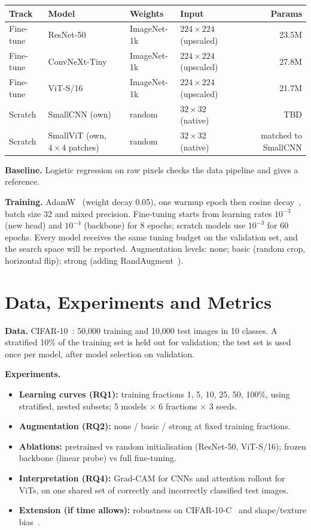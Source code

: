 \documentclass[10pt,a4paper]{article}
\begin{document}
\begin{tabularx}{\linewidth}{@{}lllXr@{}}
\toprule
\textbf{Track} & \textbf{Model} & \textbf{Weights} & \textbf{Input} & \textbf{Params} \\
\midrule
Fine-tune & ResNet-50 & ImageNet-1k & $224\times224$ (upscaled) & 23.5M \\
Fine-tune & ConvNeXt-Tiny & ImageNet-1k & $224\times224$ (upscaled) & 27.8M \\
Fine-tune & ViT-S/16 & ImageNet-1k & $224\times224$ (upscaled) & 21.7M \\
Scratch & SmallCNN (own) & random & $32\times32$ (native) & TBD \\
Scratch & SmallViT (own, $4\times4$ patches) & random & $32\times32$ (native) & matched to SmallCNN \\
\bottomrule
\end{tabularx}
\vspace{2pt}

\textbf{Baseline.} Logistic regression on raw pixels checks the data pipeline and gives a reference.

\textbf{Training.} AdamW~\cite{loshchilov2019adamw} (weight decay 0.05), one warmup epoch then cosine
decay~\cite{loshchilov2017sgdr}, batch size 32 and mixed precision. Fine-tuning starts from learning
rates $10^{-3}$ (new head) and $10^{-4}$ (backbone) for 8 epochs; scratch models use $10^{-3}$ for
60 epochs. Every model receives the same tuning budget on the validation set, and the search space
will be reported. Augmentation levels: none; basic (random crop, horizontal flip); strong
(adding RandAugment~\cite{cubuk2020randaugment}).

\section{Data, Experiments and Metrics}
\textbf{Data.} CIFAR-10~\cite{krizhevsky2009cifar}: 50,000 training and 10,000 test images in 10
classes. A stratified 10\% of the training set is held out for validation; the test set is used
once per model, after model selection on validation.

\textbf{Experiments.}
\begin{itemize}
  \item \textbf{Learning curves (RQ1):} training fractions 1, 5, 10, 25, 50, 100\%, using
  stratified, nested subsets; 5 models $\times$ 6 fractions $\times$ 3 seeds.
  \item \textbf{Augmentation (RQ2):} none / basic / strong at fixed training fractions.
  \item \textbf{Ablations:} pretrained vs random initialisation (ResNet-50, ViT-S/16); frozen
  backbone (linear probe) vs full fine-tuning.
  \item \textbf{Interpretation (RQ4):} Grad-CAM for CNNs and attention rollout for ViTs, on one
  shared set of correctly and incorrectly classified test images.
  \item \textbf{Extension (if time allows):} robustness on CIFAR-10-C~\cite{hendrycks2019robustness}
  and shape/texture bias~\cite{geirhos2019texture}.
\end{itemize}
\end{document}

